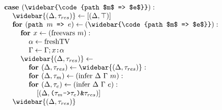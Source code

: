 \documentclass[acmsmall]{acmart}
\begin{document}
\begin{figure*}[h]
\[\begin{array}[t]{@{} l}
    \I \B{case } (\widebar{\code{path $m$ => $e$}})  :  
    \\
    \I\I \widebar{(\Delta, \tau_{res})} \leftarrow [(\Delta, \top)]
    \\
    \I\I \B{for } (\code{path $m$ => $e$}) \leftarrow (\widebar{\code{path $m$ => $e$}}): 
    \\
    \I\I\I \B{for } x \leftarrow (\F{freevars } m):
    \\
    \I\I\I\I \alpha \leftarrow \F{freshTV} 
    \\
    \I\I\I\I \Gamma \leftarrow \Gamma;\code{$x$:$\alpha$}
    \\
    \I\I\I \widebar{(\Delta, \tau_{res})} \leftarrow
    \\
    \I\I\I\I \B{for } (\Delta, \tau_{res}) \leftarrow \widebar{(\Delta, \tau_{res})}: 
    \\
    \I\I\I\I \B{for } (\Delta, \tau_{m}) \leftarrow (\F{infer } \Delta\ \Gamma\ m): 
    \\
    \I\I\I\I \B{for } (\Delta, \tau_{e}) \leftarrow (\F{infer } \Delta\ \Gamma\ e): 
    \\
    \I\I\I\I\I [(\Delta, \code{($\tau_{m}$->$\tau_{e}$)\&$\tau_{res}$})]
    \\
    \I\I \widebar{(\Delta, \tau_{res})}

    \\


\end{array}\]
\end{figure*}
\end{document}
